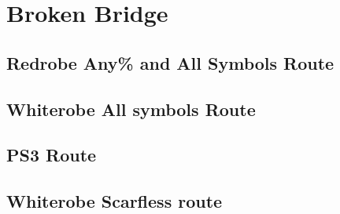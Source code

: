 \chapter{Broken Bridge}
\section{Redrobe Any\% and All Symbols Route}
\section{Whiterobe All symbols Route}
\section{PS3 Route}
\section{Whiterobe Scarfless route}
